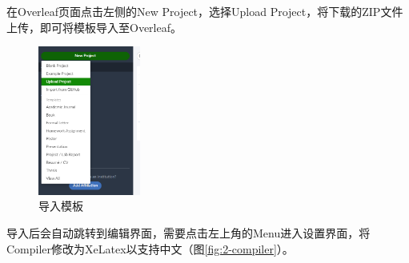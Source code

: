 在Overleaf页面点击左侧的New Project，选择Upload Project，将下载的ZIP文件上传，即可将模板导入至Overleaf。

\begin{figure}[htb]
  \centering
  \includegraphics[width=0.3\textwidth]{figures/chapter2/upload-project.png}
  \caption{导入模板}
  \label{fig:2-upload-project}
\end{figure}

导入后会自动跳转到编辑界面，需要点击左上角的Menu进入设置界面，将Compiler修改为XeLatex以支持中文（图\ref{fig:2-compiler}）。

